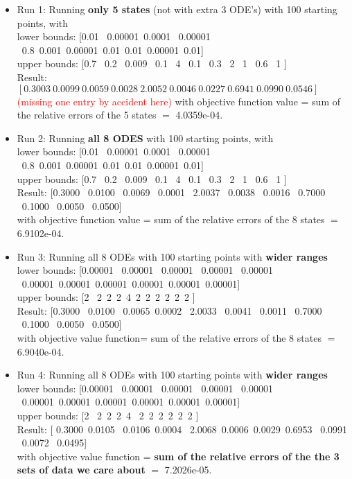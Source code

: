 \documentclass[12pt]{article}
\begin{document}
\begin{itemize}
\item Run 1: Running \textbf{only 5 states} (not with extra 3 ODE's) with 100 starting points, with \\
lower bounds: [0.01 \ 0.00001\ 0.0001 \ 0.00001 \ 0.8\ 0.001\ 0.00001\ 0.01\ 0.01\ 0.00001\ 0.01]\\
upper bounds: [0.7  \  0.2  \   0.009 \  0.1 \   4  \ 0.1  \  0.3 \    2 \  1   \  0.6 \   1  ]\\

Result: $[0.3003 \ 0.0099  \  0.0059  \  0.0028   \ 2.0052 \   0.0046 \   0.0227  \  0.6941 \   0.0990  \   0.0546]$ \textcolor{red}{(missing one entry by accident here)} with objective function value = sum of the relative errors of the 5 states
  $=$ 4.0359e-04. \\

\item Run 2: Running \textbf{all 8 ODES} with 100 starting points, with \\
lower bounds: [0.01 \ 0.00001\ 0.0001 \ 0.00001 \ 0.8\ 0.001\ 0.00001\ 0.01\ 0.01\ 0.00001\ 0.01]\\
upper bounds: [0.7  \  0.2  \   0.009 \  0.1 \   4  \ 0.1  \  0.3 \    2 \  1   \  0.6 \   1  ]\\

Result: [0.3000  \  0.0100 \   0.0069  \  0.0001  \  2.0037  \  0.0038 \   0.0016  \ 0.7000 \   0.1000    \ 0.0050  \  0.0500] \\
with objective function value = sum of the relative errors of the 8 states $=$  6.9102e-04.
 
 
\item Run 3: Running all 8 ODEs with 100 starting points with \textbf{wider ranges} \\
lower bounds: [0.00001 \ 0.00001 \ 0.00001 \ 0.00001 \ 0.00001 \ 0.00001\ 0.00001\ 0.00001\ 0.00001\ 0.00001\ 0.00001] \\
upper bounds: [2 \ 2\  2\  2\  4\  2\  2\  2\  2\  2\  2 ] \\

Result: [0.3000   \ 0.0100 \   0.0065\    0.0002  \  2.0033  \  0.0041  \  0.0011 \   0.7000 \ 0.1000   \ 0.0050   \ 0.0500] \\
with objective value function= sum of the relative errors of the 8 states $=$ 6.9040e-04.

\item Run 4: Running all 8 ODEs with 100 starting points with \textbf{wider ranges}  \\
lower bounds: [0.00001 \ 0.00001 \ 0.00001 \ 0.00001 \ 0.00001 \ 0.00001\ 0.00001\ 0.00001\ 0.00001\ 0.00001\ 0.00001] \\
upper bounds: [2 \ 2\  2\  2\  4 \  2\  2\  2\  2\  2\  2 ] \\
Result: [ 0.3000\    0.0105  \  0.0106\    0.0004 \   2.0068\    0.0006\    0.0029\  0.6953 \   0.0991 \   0.0072 \    0.0495] \\
with objective value function = \textbf{sum of the relative errors of the the 3 sets of data we care about} $=$  7.2026e-05. 


\end{itemize}
\end{document}
